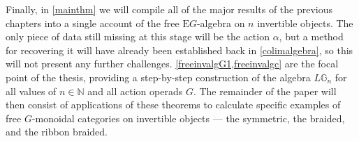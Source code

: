 Finally, in \cref{mainthm} we will compile all of the major results of the previous chapters into a single account of the free $\mathrm{E}G$-algebra on $n$ invertible objects. The only piece of data still missing at this stage will be the action $\alpha$, but a method for recovering it will have already been established back in \cref{colimalgebra}, so this will not present any further challenges. \cref{freeinvalgG1,freeinvalgc} are the focal point of the thesis, providing a step-by-step construction of the algebra $L\mathbb{G}_n$ for all values of $n \in \mathbb{N}$ and all action operads $G$. The remainder of the paper will then consist of applications of these theorems to calculate specific examples of free $G$-monoidal categories on invertible objects --- the symmetric, the braided, and the ribbon braided.  




















